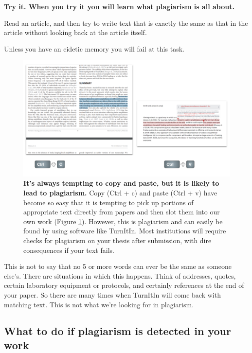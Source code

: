 \documentclass[
]{krantz}
\begin{document}
\textbf{Try it. When you try it you will learn what plagiarism is all about.}

Read an article, and then try to write text that is exactly the same as that in the article without looking back at the article itself.

Unless you have an eidetic memory you will fail at this task.



\begin{figure}
\includegraphics[width=0.95\linewidth]{figures/plagiarism} \caption{\textbf{It's always tempting to copy and paste, but it is likely to lead to plagiarism.} Copy (Ctrl + c) and paste (Ctrl + v) have become so easy that it is tempting to pick up portions of appropriate text directly from papers and then slot them into our own work (Figure \ref{fig:plagiarism}). However, this is plagiarism and can easily be found by using software like TurnItIn. Most institutions will require checks for plagiarism on your thesis after submission, with dire consequences if your text fails.}\label{fig:plagiarism}
\end{figure}

This is not to say that no 5 or more words can ever be the same as someone else's. There are situations in which this happens. Think of addresses, quotes, certain laboratory equipment or protocols, and certainly references at the end of your paper. So there are many times when TurnItIn will come back with matching text. This is not what we're looking for in plagiarism.

\hypertarget{what-to-do-if-plagiarism-is-detected-in-your-work}{%
\subsection{What to do if plagiarism is detected in your work}\label{what-to-do-if-plagiarism-is-detected-in-your-work}}
\end{document}
